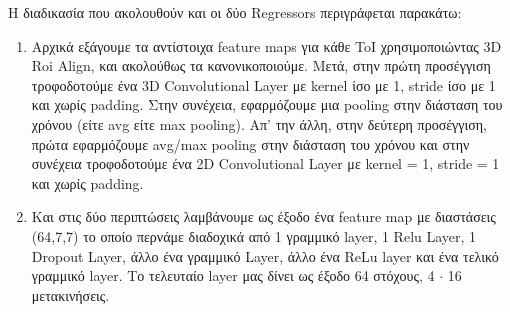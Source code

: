 Η διαδικασία που ακολουθούν και οι δύο \en Regressors \gr περιγράφεται παρακάτω:
\begin{enumerate}
\item Αρχικά εξάγουμε τα αντίστοιχα \en feature maps \gr για κάθε \en ToI \gr χρησιμοποιώντας \en 3D Roi Align\gr, και ακολούθως τα κανονικοποιούμε. Μετά, στην πρώτη προσέγγιση
τροφοδοτούμε ένα \en 3D Convolutional Layer \gr με \en  kernel \gr ίσο με 1, \en stride \gr ίσο με 1 και χωρίς \en padding\gr. Στην συνέχεια, εφαρμόζουμε μια
\en pooling  στην διάσταση του χρόνου (είτε \en avg \gr είτε \en max pooling\gr). Απ'   την άλλη, στην δεύτερη προσέγγιση, πρώτα εφαρμόζουμε \en avg/max pooling \gr στην
διάσταση του χρόνου και στην συνέχεια τροφοδοτούμε ένα \en 2D Convolutional Layer \gr με \en kernel = 1, stride = 1 \gr και χωρίς \en padding\gr.
\item Και στις δύο περιπτώσεις λαμβάνουμε ως έξοδο ένα \en feature map \gr με διαστάσεις (64,7,7) το οποίο περνάμε διαδοχικά από 1 γραμμικό  \en layer, 1 Relu Layer, 1 Dropout Layer, \gr
  άλλο ένα γραμμικό \en Layer\gr, άλλο ένα \en ReLu layer \gr και ένα τελικό γραμμικό \en layer\gr. Το τελευταίο \en layer \gr μας δίνει ως έξοδο 64 στόχους, 4 $\cdot$ 16 μετακινήσεις.
\end{enumerate}


